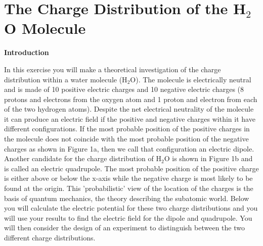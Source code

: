 \section{The Charge Distribution of the \texorpdfstring{H$_2$O}{H2O} Molecule}

\makelabheader %

\textbf{Introduction}

In this exercise you will make a theoretical investigation of the
charge distribution within a water molecule (H$_2$O). The molecule
is electrically neutral and is made of 10 positive electric charges
and 10 negative electric charges (8 protons and electrons from the
oxygen atom and 1 proton and electron from each of the two hydrogen
atoms). Despite the net electrical neutrality of the molecule it can
produce an electric field if the positive and negative charges within
it have different configurations. If the most probable position of
the positive charges in the molecule does not coincide with the most
probable position of the negative charges as shown in Figure 1a, then
we call that configuration an electric dipole. Another candidate for
the charge distribution of H$_2$O is shown in Figure 1b and
is called an electric quadrupole. The most probable position of the
positive charge is either above or below the x-axis while the negative
charge is most likely to be found at the origin. This 'probabilistic'
view of the location of the charges is the basis of quantum mechanics,
the theory describing the subatomic world. Below you will calculate
the electric potential for these two charge distributions and you
will use your results to find the electric field for the dipole and
quadrupole. You will then consider the design of an experiment to
distinguish between the two different charge distributions.

